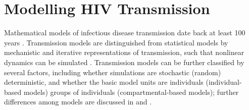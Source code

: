 \section{Modelling HIV Transmission}\label{intro.model}
Mathematical models of infectious disease transmission
date back at least 100 years \cite{Hethcote2000}.
Transmission models are distinguished from statistical models by
mechanistic and iterative representations of transmission, such that
nonlinear dynamics can be simulated \cite{Garnett2011}.
Transmission models can be further classified by several factors,
including whether simulations are stochastic (random) \vs deterministic,
and whether the basic model units are
individuals (individual-based models) \vs
groups of individuals (compartmental-based models);
further differences among models are discussed in
 and \cite{Garnett2011,Johnson2016mf}.
